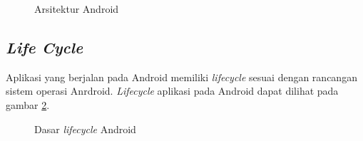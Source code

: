 \begin{figure}[h]
\centering
{}
\caption[Arsitektur Android]{Arsitektur Android} 
\label{fig:arsitektur_android}
\end{figure}

\subsection{\textit{Life Cycle}}
\label{subsec:lifecycle}

Aplikasi yang berjalan pada Android memiliki \textit{lifecycle} sesuai dengan rancangan sistem operasi Anrdroid. \textit{Lifecycle} aplikasi pada Android dapat dilihat pada gambar \ref{fig:dasar_lifecycle_android}.

\begin{figure}[h]
\centering
{}
\caption[Dasar \textit{lifecycle} Android]{Dasar \textit{lifecycle} Android} 
\label{fig:dasar_lifecycle_android}
\end{figure}

